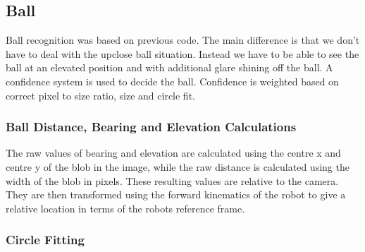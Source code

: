 \subsection{Ball}

Ball recognition was based on previous code. The main difference is that we don't have to deal with the upclose ball situation. Instead we have to be able to see the ball at an elevated position and with additional glare shining off the ball. A confidence system is used to decide the ball. Confidence is weighted based on correct pixel to size ratio, size and circle fit.

\subsubsection{Ball Distance, Bearing and Elevation Calculations}
The raw values of bearing and elevation are calculated using the centre x and centre y of the blob in the image, while the raw
distance is calculated using the width of the blob in pixels. These resulting values are relative to the camera. They are then transformed using the forward kinematics of the robot to give a relative location in terms of the robots reference frame.

\subsubsection{Circle Fitting}

